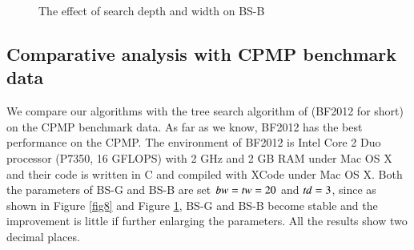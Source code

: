 \documentclass[review,3p,times,authoryear,12pt]{elsarticle}
\begin{document}
\begin{figure}[htbp]
\caption{The effect of search depth and width on BS-B}
\label{fig9}
\end{figure}

\subsection {Comparative analysis with CPMP benchmark data}

We compare our algorithms with the tree search algorithm of \cite{BF2012} (BF2012 for short) on the CPMP benchmark data. As far as we know, BF2012 has the best performance on the CPMP. The environment of BF2012 is Intel Core 2 Duo processor (P7350, 16 GFLOPS) with 2 GHz and 2 GB RAM under Mac OS X and their code is written in C and compiled with XCode under Mac OS X. Both the parameters of BS-G and BS-B are set $\id{bw}=\id{tw}=20$ and $\id{td}=3$, since as shown in Figure \ref{fig8} and Figure \ref{fig9}, BS-G and BS-B become stable and the improvement is little if further enlarging the parameters. All the results show two decimal places.
\end{document}
